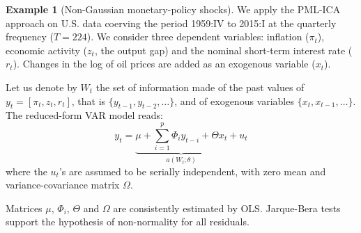 \documentclass[
  12pt,
]{book}
\newenvironment{Shaded}{\begin{snugshade}}{\end{snugshade}}
\newcommand{\DecValTok}[1]{\textcolor[rgb]{0.00,0.00,0.81}{#1}}
\newcommand{\FunctionTok}[1]{\textcolor[rgb]{0.13,0.29,0.53}{\textbf{#1}}}
\newcommand{\NormalTok}[1]{#1}
\newcommand{\OtherTok}[1]{\textcolor[rgb]{0.56,0.35,0.01}{#1}}
\newcommand{\SpecialCharTok}[1]{\textcolor[rgb]{0.81,0.36,0.00}{\textbf{#1}}}
\newcommand{\StringTok}[1]{\textcolor[rgb]{0.31,0.60,0.02}{#1}}
\theoremstyle{definition}
\theoremstyle{definition}
\newtheorem{example}{Example}[chapter]
\theoremstyle{definition}
\theoremstyle{definition}
\theoremstyle{remark}
\begin{document}
\begin{example}[Non-Gaussian monetary-policy shocks]
\protect\hypertarget{exm:GMR2017}{}\label{exm:GMR2017}We apply the PML-ICA approach on U.S. data coerving the period 1959:IV to 2015:I at the quarterly frequency (\(T=224\)). We consider three dependent variables: inflation (\(\pi_t\)), economic activity (\(z_t\), the output gap) and the nominal short-term interest rate (\(r_t\)). Changes in the log of oil prices are added as an exogenous variable (\(x_t\)).

\begin{Shaded}
\end{Shaded}

Let us denote by \(W_t\) the set of information made of the past values of \(y_t= [\pi_t,z_t,r_t]\), that is \(\{y_{t-1},y_{t-2},\dots\}\), and of exogenous variables \(\{x_{t},x_{t-1},\dots\}\). The reduced-form VAR model reads:
\[
y_t  = \underbrace{\mu + \sum_{i=1}^{p} \Phi_i y_{t-i} + \Theta x_t}_{a(W_t;\theta)} + u_t
\]
where the \(u_t\)'s are assumed to be serially independent, with zero mean and variance-covariance matrix \(\Omega\).

Matrices \(\mu\), \(\Phi_i\), \(\Theta\) and \(\Omega\) are consistently estimated by OLS. Jarque-Bera tests support the hypothesis of non-normality for all residuals.


\end{example}
\end{document}

